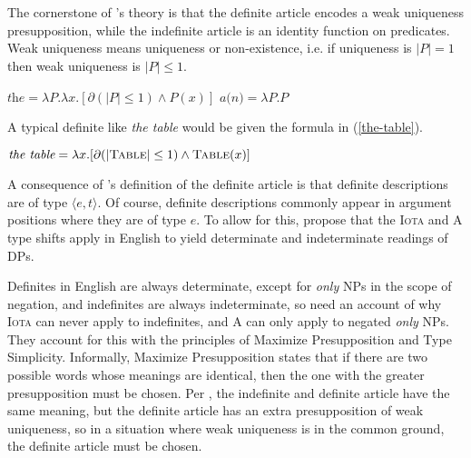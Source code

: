\section{\citet{cb2015} \label{sec:coppock-beaver}}
The cornerstone of \citeauthor{cb2015}'s theory is that the definite article encodes a weak uniqueness presupposition, while the indefinite article is an identity function on predicates. Weak uniqueness means uniqueness or non-existence, i.e. if uniqueness is $|P| = 1$ then weak uniqueness is $|P| \le 1$.

\begin{exe}
	\ex $\textit{the} = \lambda P . \lambda x . [\partial(|P| \le 1) \land P(x)]$
	\ex $\textit{a(n)} = \lambda P . P$
\end{exe}

A typical definite like \textit{the table} would be given the formula in (\ref{the-table}).

\begin{exe}
	\ex \label{the-table} $\textit{the table} = \lambda x . [ \partial(|\textsc{Table}| \le 1) \land \textsc{Table}(x) ]$
\end{exe}

A consequence of \citeauthor{cb2015}'s definition of the definite article is that definite descriptions are of type $\langle e, t \rangle$. Of course, definite descriptions commonly appear in argument positions where they are of type $e$. To allow for this, \citeauthor{cb2015} propose that the \textsc{Iota} and \textsc{A} type shifts apply in English to yield determinate and indeterminate readings of DPs.


Definites in English are always determinate, except for \textit{only} NPs in the scope of negation, and indefinites are always indeterminate, so \citeauthor{cb2015} need an account of why \textsc{Iota} can never apply to indefinites, and \textsc{A} can only apply to negated \textit{only} NPs. They account for this with the principles of Maximize Presupposition and Type Simplicity. Informally, Maximize Presupposition states that if there are two possible words whose meanings are identical, then the one with the greater presupposition must be chosen. Per \citeauthor{cb2015}, the indefinite and definite article have the same meaning, but the definite article has an extra presupposition of weak uniqueness, so in a situation where weak uniqueness is in the common ground, the definite article must be chosen.

